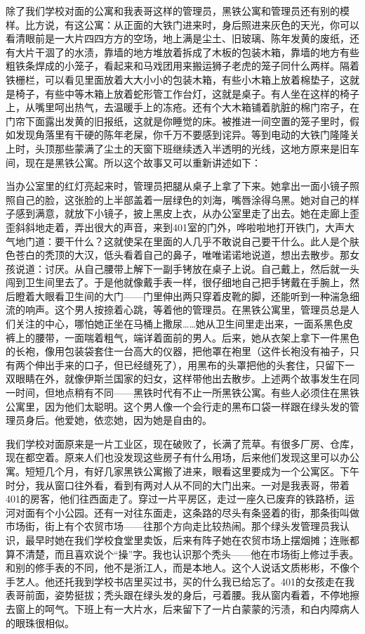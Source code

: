 除了我们学校对面的公寓和我表哥这样的管理员，黑铁公寓和管理员还有别的模样。比方说，有这公寓：从正面的大铁门进来时，身后照进来灰色的天光，你可以看清眼前是一大片四四方方的空场，地上满是尘土、旧玻璃、陈年发黄的废纸，还有大片干涸了的水渍，靠墙的地方堆放着拆成了木板的包装木箱，靠墙的地方有些粗铁条焊成的小笼子，看起来和马戏团用来搬运狮子老虎的笼子同什么两样。隔着铁栅栏，可以看见里面放着大大小小的包装木箱，有些小木箱上放着棉垫子，这就是椅子，有些中等木箱上放着蛇形管工作台灯，这就是桌子。有人坐在这样的椅子上，从嘴里呵出热气，去温暖手上的冻疮。还有个大木箱铺着肮脏的棉门帘子，在门帘下面露出发黄的旧报纸，这就是你睡觉的床。被推进一间空置的笼子里时，假如发现角落里有干硬的陈年老屎，你千万不要感到诧异。等到电动的大铁门隆隆关上时，头顶那些蒙满了尘土的天窗下班继续透入半透明的光线，这地方原来是旧车间，现在是黑铁公寓。所以这个故事又可以重新讲述如下： 

当办公室里的红灯亮起来时，管理员把腿从桌子上拿了下来。她拿出一面小镜子照照自己的脸，这张脸的上半部盖着一层绿色的刘海，嘴唇涂得乌黑。她对自己的样子感到满意，就放下小镜子，披上黑皮上衣，从办公室里走了出去。她在走廊上歪歪斜斜地走着，弄出很大的声音，来到401室的门外，哗啦啦地打开铁门，大声大气地门道：要干什么？这就使呆在里面的人几乎不敢说自己要干什么。此人是个肤色苍白的秃顶的大汉，低头看着自己的鼻子，唯唯诺诺地说道，想出去散步。那女孩说道：讨厌。从自己腰带上解下一副手铐放在桌子上说。自己戴上，然后就一头闯到卫生间里去了。于是他就像戴手表一样，很仔细地自己把手铐戴在手腕上，然后瞪着大眼看卫生间的大门——门里伸出两只穿着皮靴的脚，还能听到一种湍急细流的响声。这个男人按捺着心跳，等着他的管理员。在黑铁公寓里，管理员总是人们关注的中心，哪怕她正坐在马桶上撒尿……她从卫生间里走出来，一面系黑色皮裤上的腰带，一面喘着粗气，端详着面前的男人。后来，她从衣架上拿下一件黑色的长袍，像用包装袋套住一台高大的仪器，把他罩在袍里（这件长袍没有袖子，只有两个伸出手来的口子，但已经缝死了），用黑布的头罩把他的头套住，只留下一双眼睛在外，就像伊斯兰国家的妇女，这样带他出去散步。上述两个故事发生在同一时间，但地点稍有不同——黑铁时代有不止一所黑铁公寓。有些人必须住在黑铁公寓里，因为他们太聪明。这个男人像一个会行走的黑布口袋一样跟在绿头发的管理员身后。他爱她，依恋她，因为她是自由的。 

我们学校对面原来是一片工业区，现在破败了，长满了荒草。有很多厂房、仓库，现在都空着。原来人们也没发现这些房子有什么用场，后来他们发现这里可以办公寓。短短几个月，有好几家黑铁公寓搬了进来，眼看这里要成为一个公寓区。下午时分，我从窗口往外看，看到有两对人从不同的大门出来。一对是我表哥，带着401的房客，他们往西面走了。穿过一片平房区，走过一座久已废弃的铁路桥，运河对面有个小公园。还有一对往东面走，这条路的尽头有条竖着的街，那条街叫做市场街，街上有个农贸市场——往那个方向走比较热闹。那个绿头发管理员我认识，最早时她在我们学校食堂里卖饭，后来有阵子她在农贸市场上摆烟摊；连账都算不清楚，而且喜欢说个“操”字。我也认识那个秃头——他在市场街上修过手表。和别的修手表的不同，他不是浙江人，而是本地人。这个人说话文质彬彬，不像个手艺人。他还托我到学校书店里买过书，买的什么我已给忘了。401的女孩走在我表哥前面，姿势挺拔；秃头跟在绿头发的身后，弓着腰。我从窗内看着，不停地擦去窗上的呵气。下班上有一大片水，后来留下了一片白蒙蒙的污渍，和白内障病人的眼珠很相似。 



